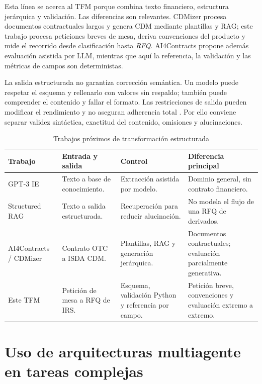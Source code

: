Esta línea se acerca al TFM porque combina texto financiero, estructura jerárquica y validación. Las diferencias son relevantes. CDMizer procesa documentos contractuales largos y genera CDM mediante plantillas y RAG; este trabajo procesa peticiones breves de mesa, deriva convenciones del producto y mide el recorrido desde clasificación hasta \textit{RFQ}. AI4Contracts propone además evaluación asistida por LLM, mientras que aquí la referencia, la validación y las métricas de campos son deterministas.

La salida estructurada no garantiza corrección semántica. Un modelo puede respetar el esquema y rellenarlo con valores sin respaldo; también puede comprender el contenido y fallar el formato. Las restricciones de salida pueden modificar el rendimiento y no aseguran adherencia total \citep{tam2024formatrestrictions}. Por ello conviene separar validez sintáctica, exactitud del contenido, omisiones y alucinaciones.

\begin{table}[H]
\centering
\small
\caption{Trabajos próximos de transformación estructurada}
\label{tab:trabajos_extraccion_proximos}
\begin{tabular}{|P{3.0cm}|P{3.6cm}|P{3.6cm}|P{3.6cm}|}
\hline
\textbf{Trabajo} & \textbf{Entrada y salida} & \textbf{Control} & \textbf{Diferencia principal} \\
\hline
GPT-3 IE & Texto a base de conocimiento. & Extracción asistida por modelo. & Dominio general, sin contrato financiero. \\
\hline
Structured RAG & Texto a salida estructurada. & Recuperación para reducir alucinación. & No modela el flujo de una RFQ de derivados. \\
\hline
AI4Contracts / CDMizer & Contrato OTC a ISDA CDM. & Plantillas, RAG y generación jerárquica. & Documentos contractuales; evaluación parcialmente generativa. \\
\hline
Este TFM & Petición de mesa a RFQ de IRS. & Esquema, validación Python y referencia por campo. & Petición breve, convenciones y evaluación extremo a extremo. \\
\hline
\end{tabular}
\end{table}

\section{Uso de arquitecturas multiagente en tareas complejas}
\label{sec:arquitecturas_multiagente_estado_arte}

